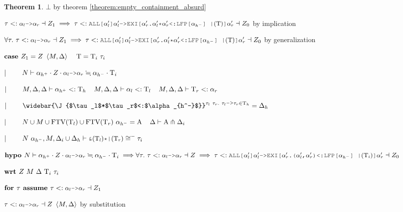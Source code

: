 \documentclass[acmsmall]{acmart}
\theoremstyle{definition}
\newtheorem{theorem}{Theorem}[section]
\begin{document}
\begin{theorem}
        \item \Z\Z\Z\Z $\bot$ by theorem \ref{theorem:empty_containment_absurd}
      \item \Z\Z\Z $
        \tau \subtypes \J{$\alpha_l$->$\alpha_r$} \given Z_1
        \implies
        \tau
        \subtypes
        \J{ALL[$\alpha_l'$]$\alpha_l'$->EXI[$\alpha_r'$.$\alpha_l'$*$\alpha_r'$<:LFP[$\alpha_{h^-}$] |$(\Tau)$]$\alpha_r'$} 
        \given Z_0
      $ by implication
    \item \Z\Z $
      \forall \tau .\ 
      \tau \subtypes \J{$\alpha_l$->$\alpha_r$} \given Z_1
      \implies
      \tau
      \subtypes
      \J{ALL[$\alpha_l'$]$\alpha_l'$->EXI[$\alpha_r'$.$\alpha_l'$*$\alpha_r'$<:LFP[$\alpha_{h^-}$] |$(\Tau)$]$\alpha_r'$} 
      \given Z_0
    $ by generalization 
  \item \Z $\B{case }
    Z_1 = Z\ \left<M, \Delta \right> \I \Tau = \Tau_i\ \tau_i
  $
  \item \Z $\contin
    N \entails 
    \alpha_{h^+} \cdot Z \cdot \J{$\alpha_l$->$\alpha_r$} 
    \fallingdotseq 
    \alpha_{h^-} \cdot \Tau_i
  $
  \item \Z $|\ \ \ \ \ \ \ 
    M, \Delta, \Delta \vdash \alpha_{h^+} <: \mathrm{T}_h
    \hspace{4mm}
    M, \Delta, \Delta \vdash \alpha_l <: \mathrm{T}_l 
    \hspace{4mm}
    M, \Delta, \Delta \vdash \mathrm{T}_r <: \alpha_r
  $
  \item \Z $\contin
    \widebar{\J{$\tau_l$*$\tau_r$<:$\alpha_{h^-}$}}^{\tau_l\ \tau_r .\ \tau_l\J{->}\tau_r \in \Tau_h} = \Delta_h
  $
  \item \Z $\contin
    N \cup M \cup \text{FTV}(\Tau_l) \cup \text{FTV}(\Tau_r)\ \alpha_{h^-} = \Alpha 
    \I
    \Delta \entails \Alpha \pitchfork \Delta_i  
  $
  \item \Z $\contin
    N\ \alpha_{h^-}, M, \Delta_i \cup \Delta_h \entails \J{\&$(\Tau_l)$*|$(\Tau_r)$} \cong^{-} \tau_i
  $
  \item \Z $\B{hypo }
    N \entails 
    \alpha_{h^+} \cdot Z \cdot \J{$\alpha_l$->$\alpha_r$} 
    \fallingdotseq 
    \alpha_{h^-} \cdot \Tau_i
    \implies
    \\
    \forall \tau .\ 
    \tau \subtypes \J{$\alpha_l$->$\alpha_r$} \given Z
    \implies
    \tau
    \subtypes
    \J{ALL[$\alpha_l'$]$\alpha_l'$->EXI[$\alpha_r'$.($\alpha_l'$,$\alpha_r'$)<:LFP[$\alpha_{h^-}$] |$(\Tau_i)$]$\alpha_r'$} 
    \given Z_0
  $
  \item \Z $\textbf{wrt }
    Z\ M\ \Delta\ \mathrm{T}_i\ \tau_i
  $

    \item \Z\Z $\B{for } \tau \B{ assume }
      \tau \subtypes \J{$\alpha_l$->$\alpha_r$} \given Z_1
    $
      \item \Z\Z\Z $
        \tau \subtypes \J{$\alpha_l$->$\alpha_r$} \given Z\ \left<M, \Delta\right>
      $ by substitution


\end{theorem}
\end{document}
